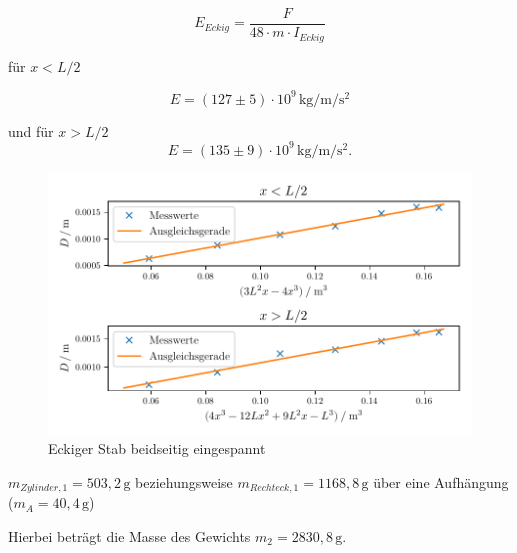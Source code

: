 \begin{equation}
  E_{Eckig}=\frac{F}{48 \cdot m \cdot I_{Eckig}}
\end{equation}

\noindent für $x<L/2$

\begin{equation*}
  E=(127 \pm 5) \cdot 10^9 \,\si{\kilo\gram\per\meter\per\second\squared}
\end{equation*}


\noindent und für $x>L/2$
\begin{equation*}
  E=(135 \pm 9) \cdot 10^9 \,\si{\kilo\gram\per\meter\per\second\squared}.
\end{equation*}



\begin{figure}[H]
  \centering
  \includegraphics{build/plot4.pdf}
  \caption{Eckiger Stab beidseitig eingespannt}
  \label{fig:d}
\end{figure}



 $m_{Zylinder,1} = 503,2\, \si{\gram}$ beziehungsweise 
$m_{Rechteck,1} = 1168,8\, \si{\gram}$ über eine Aufhängung ($m_{A} = 40,4\, \si{\gram}$) 


 Hierbei beträgt die Masse des Gewichts $m_{2} = 2830,8\, \si{\gram}$.